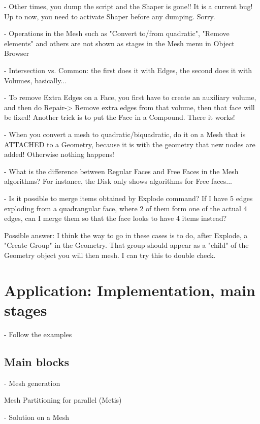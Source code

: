 \documentclass[10pt]{book}
\begin{document}
- Other times, you dump the script and the Shaper is gone!! It is a current bug! Up to now, you need to activate Shaper before any dumping. Sorry.

- Operations in the Mesh such as "Convert to/from quadratic", "Remove elements" and others
  are not shown as stages in the Mesh menu in Object Browser

- Intersection vs. Common: the first does it with Edges, the second does it with Volumes, basically...

- To remove Extra Edges on a Face, you first have to create an auxiliary volume, and then do Repair-> Remove extra edges from that volume,
  then that face will be fixed!
  Another trick is to put the Face in a Compound. There it works!

- When you convert a mesh to quadratic/biquadratic, do it on a Mesh that is ATTACHED to a Geometry, because it is with the geometry that new nodes are added! 
  Otherwise nothing happens!

- What is the difference between Regular Faces and Free Faces in the Mesh algorithms? For instance, the Disk only shows algorithms for Free faces...

- Is it possible to merge items obtained by Explode command? If I have 5 edges exploding from a quadrangular face,
  where 2 of them form one of the actual 4 edges, can I merge them so that the face looks to have 4 items instead?
    
  Possible answer: I think the way to go in these cases is to do, after Explode, a "Create Group" in the Geometry.
    That group should appear as a "child" of the Geometry object you will then mesh. I can try this to double check.



\part{Application: Implementation, main stages}


  - Follow the examples

  
   \chapter{Main blocks}


 
 - Mesh generation
 
   Mesh Partitioning for parallel (Metis)
 
 - Solution on a Mesh
\end{document}
